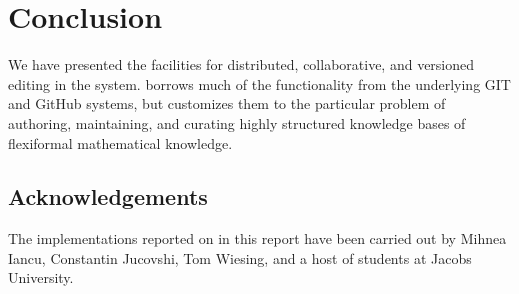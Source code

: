 \section{Conclusion}\label{sec:concl}

We have presented the facilities for distributed, collaborative, and versioned editing in
the \sys system. \sys borrows much of the functionality from the underlying GIT and GitHub
systems, but customizes them to the particular problem of authoring, maintaining, and
curating highly structured knowledge bases of flexiformal mathematical knowledge. 

\subsection*{Acknowledgements}

The implementations reported on in this report have been carried out by Mihnea Iancu,
Constantin Jucovshi, Tom Wiesing, and a host of students at Jacobs University.



